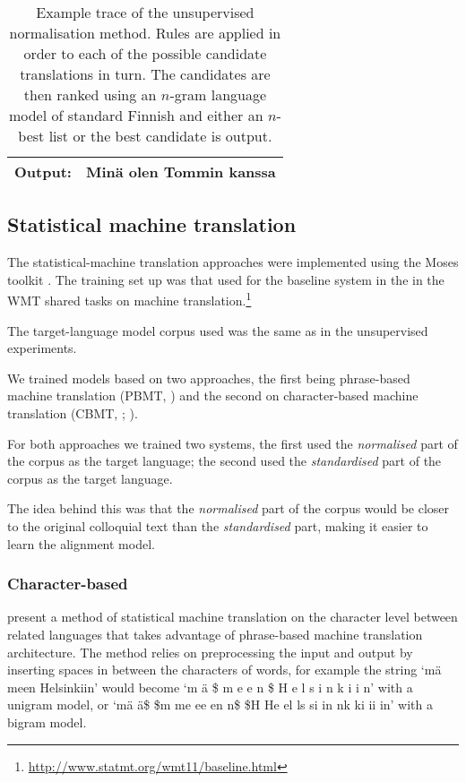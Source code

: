 \documentclass[11pt]{article}
\begin{document}
\begin{table*}
\begin{tabular}{|l|r|l|l|}
    \hline
    \textbf{Output:} & \multicolumn{3}{l|}{Min\"{a} olen Tommin kanssa} \\
    \hline
  \end{tabular}
  \caption{Example trace of the unsupervised normalisation method. Rules are applied in order to each of 
     the possible candidate translations in turn. The candidates are then ranked using an $n$-gram language model 
     of standard Finnish and either an $n$-best list
     or the best candidate is output.}
  \label{table:unsup-trace}
\end{table*}

\subsection{Statistical machine translation}

The statistical-machine translation approaches were implemented using the 
Moses toolkit \cite{koehn2007}. The training set up was that used for
the baseline system in the  in the WMT shared tasks
on machine translation.\footnote{\url{http://www.statmt.org/wmt11/baseline.html}}

The target-language model corpus used was the same as in the unsupervised experiments. 

We trained models based on two approaches, the first being phrase-based machine translation (PBMT, ) and the second on character-based machine translation (CBMT, ; ).

For both approaches we trained two systems, the first used the \emph{normalised}
part of the corpus as the target language; the second used the \emph{standardised} 
part of the corpus as the target language.

The idea behind this was that the \emph{normalised} part of the corpus would be closer
to the original colloquial text than the \emph{standardised} part, making it easier
to learn the alignment model. 

\subsubsection{Character-based}

 present a method of statistical machine translation on the character level between related languages that takes advantage of phrase-based machine translation architecture. The method relies on preprocessing the input and output by inserting spaces in between the characters of words, for example the string `m\"{a} meen Helsinkiin' would become `m \"{a} \$ m e e n \$ H e l s i n k i i n' with a unigram model, or `m\"{a} \"{a}\$ \$m me ee en n\$ \$H He el ls si in nk ki ii in' with a bigram model.
\end{document}
